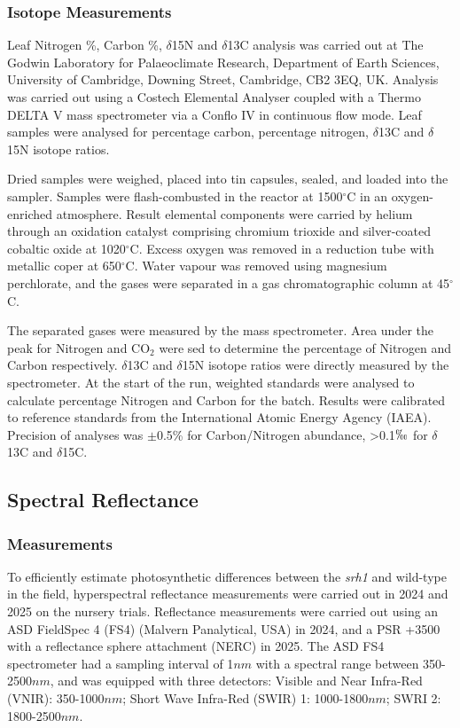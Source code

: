 \documentclass{article}
\begin{document}
\subsubsection{Isotope Measurements}
Leaf Nitrogen \%, Carbon \%, $\delta$15N and $\delta$13C analysis was carried
out at The Godwin Laboratory for Palaeoclimate Research, Department of Earth
Sciences, University of Cambridge, Downing Street, Cambridge, CB2 3EQ, UK.
Analysis was carried out using a Costech Elemental Analyser coupled with a
Thermo DELTA V mass spectrometer via a Conflo IV in continuous flow mode. Leaf
samples were analysed for percentage carbon, percentage nitrogen, $\delta$13C
and $\delta$15N isotope ratios.

Dried samples were weighed, placed into tin capsules, sealed, and loaded
into the sampler. Samples were flash-combusted in the reactor at 1500$^{\circ}$C
in an oxygen-enriched atmosphere. Result elemental components were carried
by helium through an oxidation catalyst comprising chromium trioxide and
silver-coated cobaltic oxide at 1020$^{\circ}$C. Excess oxygen was removed in
a reduction tube with metallic coper at 650$^{\circ}$C. Water vapour was
removed using magnesium perchlorate, and the gases were separated in a gas chromatographic
column at 45$^{\circ}$C.

The separated gases were measured by the mass spectrometer. Area under the
peak for Nitrogen and CO$_{2}$ were sed to determine the percentage of Nitrogen
and Carbon respectively. $\delta$13C and $\delta$15N isotope ratios were
directly measured by the spectrometer. At the start of the run, weighted
standards were analysed to calculate percentage Nitrogen and Carbon for the
batch. Results were calibrated to reference standards from the International
Atomic Energy Agency (IAEA). Precision of analyses was $\pm$0.5\% for Carbon/Nitrogen
abundance, >0.1$\permil$ for $\delta$13C and $\delta$15C.

\subsection{Spectral Reflectance}

\subsubsection{Measurements}
To efficiently estimate photosynthetic differences between the \textit{srh1} and wild-type in the field, hyperspectral reflectance measurements were carried out in 2024 and 2025 on the nursery trials. Reflectance measurements were carried out using an ASD FieldSpec 4 (FS4) (Malvern Panalytical, USA) in 2024, and a PSR +3500 with a reflectance sphere attachment (NERC) in 2025. The ASD FS4 spectrometer had a sampling interval of 1$nm$ with a spectral range between 350-2500$nm$, and was equipped with three detectors: Visible and Near Infra-Red (VNIR): 350-1000$nm$; Short Wave Infra-Red (SWIR) 1: 1000-1800$nm$; SWRI 2: 1800-2500$nm$.
\end{document}
